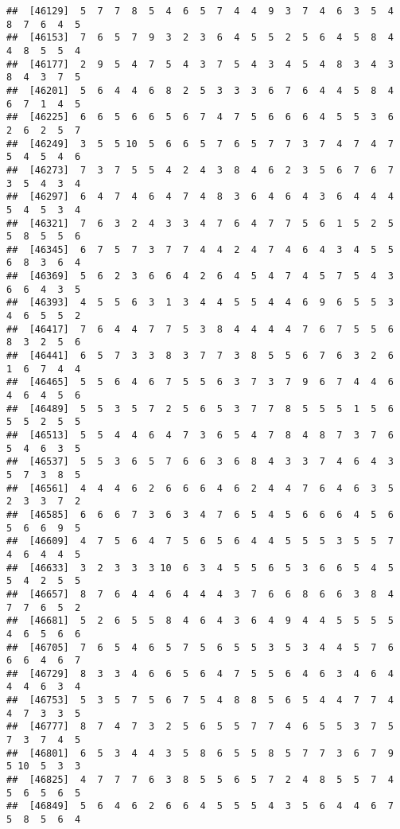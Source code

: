 \documentclass[
]{book}
\begin{document}
\begin{verbatim}
##  [46129]  5  7  7  8  5  4  6  5  7  4  4  9  3  7  4  6  3  5  4  8  7  6  4  5
##  [46153]  7  6  5  7  9  3  2  3  6  4  5  5  2  5  6  4  5  8  4  4  8  5  5  4
##  [46177]  2  9  5  4  7  5  4  3  7  5  4  3  4  5  4  8  3  4  3  8  4  3  7  5
##  [46201]  5  6  4  4  6  8  2  5  3  3  3  6  7  6  4  4  5  8  4  6  7  1  4  5
##  [46225]  6  6  5  6  6  5  6  7  4  7  5  6  6  6  4  5  5  3  6  2  6  2  5  7
##  [46249]  3  5  5 10  5  6  6  5  7  6  5  7  7  3  7  4  7  4  7  5  4  5  4  6
##  [46273]  7  3  7  5  5  4  2  4  3  8  4  6  2  3  5  6  7  6  7  3  5  4  3  4
##  [46297]  6  4  7  4  6  4  7  4  8  3  6  4  6  4  3  6  4  4  4  5  4  5  3  4
##  [46321]  7  6  3  2  4  3  3  4  7  6  4  7  7  5  6  1  5  2  5  5  8  5  5  6
##  [46345]  6  7  5  7  3  7  7  4  4  2  4  7  4  6  4  3  4  5  5  6  8  3  6  4
##  [46369]  5  6  2  3  6  6  4  2  6  4  5  4  7  4  5  7  5  4  3  6  6  4  3  5
##  [46393]  4  5  5  6  3  1  3  4  4  5  5  4  4  6  9  6  5  5  3  4  6  5  5  2
##  [46417]  7  6  4  4  7  7  5  3  8  4  4  4  4  7  6  7  5  5  6  8  3  2  5  6
##  [46441]  6  5  7  3  3  8  3  7  7  3  8  5  5  6  7  6  3  2  6  1  6  7  4  4
##  [46465]  5  5  6  4  6  7  5  5  6  3  7  3  7  9  6  7  4  4  6  4  6  4  5  6
##  [46489]  5  5  3  5  7  2  5  6  5  3  7  7  8  5  5  5  1  5  6  5  5  2  5  5
##  [46513]  5  5  4  4  6  4  7  3  6  5  4  7  8  4  8  7  3  7  6  5  4  6  3  5
##  [46537]  5  5  3  6  5  7  6  6  3  6  8  4  3  3  7  4  6  4  3  5  7  3  8  5
##  [46561]  4  4  4  6  2  6  6  6  4  6  2  4  4  7  6  4  6  3  5  2  3  3  7  2
##  [46585]  6  6  6  7  3  6  3  4  7  6  5  4  5  6  6  6  4  5  6  5  6  6  9  5
##  [46609]  4  7  5  6  4  7  5  6  5  6  4  4  5  5  5  3  5  5  7  4  6  4  4  5
##  [46633]  3  2  3  3  3 10  6  3  4  5  5  6  5  3  6  6  5  4  5  5  4  2  5  5
##  [46657]  8  7  6  4  4  6  4  4  4  3  7  6  6  8  6  6  3  8  4  7  7  6  5  2
##  [46681]  5  2  6  5  5  8  4  6  4  3  6  4  9  4  4  5  5  5  5  4  6  5  6  6
##  [46705]  7  6  5  4  6  5  7  5  6  5  5  3  5  3  4  4  5  7  6  6  6  4  6  7
##  [46729]  8  3  3  4  6  6  5  6  4  7  5  5  6  4  6  3  4  6  4  4  4  6  3  4
##  [46753]  5  3  5  7  5  6  7  5  4  8  8  5  6  5  4  4  7  7  4  4  7  3  3  5
##  [46777]  8  7  4  7  3  2  5  6  5  5  7  7  4  6  5  5  3  7  5  7  3  7  4  5
##  [46801]  6  5  3  4  4  3  5  8  6  5  5  8  5  7  7  3  6  7  9  5 10  5  3  3
##  [46825]  4  7  7  7  6  3  8  5  5  6  5  7  2  4  8  5  5  7  4  5  6  5  6  5
##  [46849]  5  6  4  6  2  6  6  4  5  5  5  4  3  5  6  4  4  6  7  5  8  5  6  4

\end{verbatim}
\end{document}

